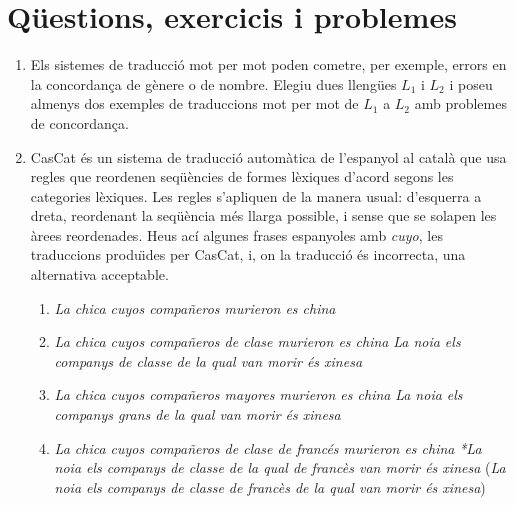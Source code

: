 \section{Qüestions, exercicis i problemes}

\begin{enumerate}
\item Els sistemes de traducció mot per mot poden cometre, per
  exemple, errors en la concordança de gènere o de nombre.  Elegiu
  dues llengües $L_1$ i $L_2$ i poseu almenys dos exemples de
  traduccions mot per mot de $L_1$ a $L_2$ amb problemes de concordança.

\item \label{ex:cascat} CasCat és un sistema de traducció automàtica
  de l'espanyol al català que usa regles que reordenen seqüències de
  formes lèxiques d'acord segons les categories lèxiques. Les regles
  s'apliquen de la manera usual: d'esquerra a dreta, reordenant la
  seqüència més llarga possible, i sense que se solapen les àrees
  reordenades.  Heus ací algunes frases espanyoles amb {\em cuyo}, les
  traduccions produ\"{\i}des per CasCat, i, on la traducció és
  incorrecta, una alternativa acceptable.
\begin{enumerate}
  
\item \emph{La chica cuyos compañeros murieron es china} 

\item \emph{La chica cuyos compañeros de clase murieron es china}
  \newline \emph{La noia els companys de classe de la qual van morir és
    xinesa}

\item \emph{La chica cuyos compañeros mayores murieron es china}
  \newline \emph{La noia els companys grans de la qual van morir és
    xinesa}

\item \emph{La chica cuyos compañeros de clase de francés murieron es
    china} \newline \emph{*La noia els companys de classe de la qual de
    francès van morir és xinesa} \newline (\emph{La noia els companys
    de classe de francès de la qual van morir és xinesa})


\end{enumerate}
\end{enumerate}
